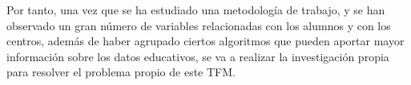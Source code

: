 Por tanto, una vez que se ha estudiado una metodología de trabajo, y se han observado un gran número de variables relacionadas con los alumnos y con los centros, además de haber agrupado ciertos algoritmos que pueden aportar mayor información sobre los datos educativos, se va a realizar la investigación propia para resolver el problema propio de este TFM.






